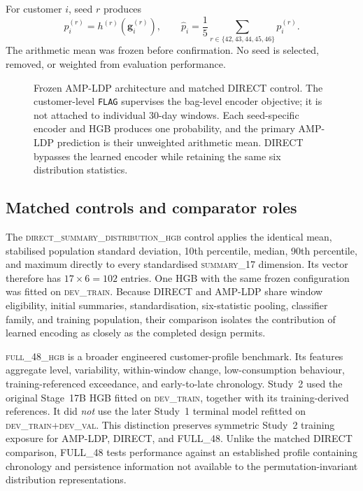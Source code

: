 For customer $i$, seed $r$ produces
\begin{equation}
  p_i^{(r)}=h^{(r)}(\mathbf{g}_i^{(r)}),
  \qquad
  \hat p_i=\frac{1}{5}\sum_{r\in\{42,43,44,45,46\}}p_i^{(r)}.
  \label{eq:ensemble}
\end{equation}
The arithmetic mean was frozen before confirmation. No seed is selected, removed, or weighted from evaluation performance.

\begin{figure}[t]
  \centering
  
  \caption{Frozen AMP-LDP architecture and matched DIRECT control. The customer-level \texttt{FLAG} supervises the bag-level encoder objective; it is not attached to individual 30-day windows. Each seed-specific encoder and HGB produces one probability, and the primary AMP-LDP prediction is their unweighted arithmetic mean. DIRECT bypasses the learned encoder while retaining the same six distribution statistics.}
  \label{fig:amp-ldp-architecture}
\end{figure}

\subsection{Matched controls and comparator roles}

The \textsc{direct\_summary\_distribution\_hgb} control applies the identical mean, stabilised population standard deviation, 10th percentile, median, 90th percentile, and maximum directly to every standardised \textsc{summary\_17} dimension. Its vector therefore has $17\times6=102$ entries. One HGB with the same frozen configuration was fitted on \textsc{dev\_train}. Because DIRECT and AMP-LDP share window eligibility, initial summaries, standardisation, six-statistic pooling, classifier family, and training population, their comparison isolates the contribution of learned encoding as closely as the completed design permits.

\textsc{full\_48\_hgb} is a broader engineered customer-profile benchmark. Its features aggregate level, variability, within-window change, low-consumption behaviour, training-referenced exceedance, and early-to-late chronology. Study~2 used the original Stage~17B HGB fitted on \textsc{dev\_train}, together with its training-derived references. It did \emph{not} use the later Study~1 terminal model refitted on \textsc{dev\_train}+\textsc{dev\_val}. This distinction preserves symmetric Study~2 training exposure for AMP-LDP, DIRECT, and FULL\_48. Unlike the matched DIRECT comparison, FULL\_48 tests performance against an established profile containing chronology and persistence information not available to the permutation-invariant distribution representations.

